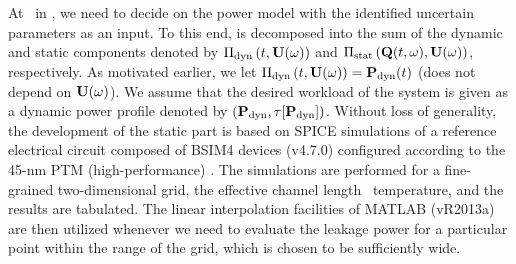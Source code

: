 At \ in , we need to decide on the power model with the identified uncertain parameters as an input.
To this end,  is decomposed into the sum of the dynamic and static components denoted by $\oPower{\dyn}{\t, \vU(\o)}$ and $\oPower{\stat}{\vTO(\t, \o), \vU(\o)}$, respectively.
As motivated earlier, we let $\oPower{\dyn}{\t, \vU(\o)} = \vP_\dyn(\t)$ (does not depend on $\mathbf{U}(\omega)$).
We assume that the desired workload of the system is given as a dynamic power profile denoted by $\profilePdyn$.
Without loss of generality, the development of the static part is based on SPICE simulations of a reference electrical circuit composed of BSIM4 devices (v4.7.0) \cite{bsim} configured according to the 45-nm PTM (high-performance) \cite{ptm}.
The simulations are performed for a fine-grained two-dimensional grid, the effective channel length \versus\ temperature, and the results are tabulated.
The linear interpolation facilities of MATLAB (vR2013a) \cite{matlab} are then utilized whenever we need to evaluate the leakage power for a particular point within the range of the grid, which is chosen to be sufficiently wide.
